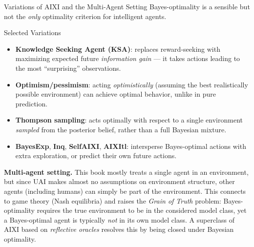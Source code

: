 \documentclass[aspectratio=169,10pt]{beamer}
\begin{document}
\begin{frame}{Variations of AIXI and the Multi-Agent Setting}
  Bayes-optimality is a sensible but not the \emph{only} optimality criterion
  for intelligent agents.

  \begin{block}{Selected Variations}
    \begin{itemize}
      \item \textbf{Knowledge Seeking Agent (KSA)}: replaces reward-seeking
        with maximizing expected future \emph{information gain} --- it takes
        actions leading to the most ``surprising'' observations.
      \item \textbf{Optimism/pessimism}: acting \emph{optimistically}
        (assuming the best realistically possible environment) can achieve
        optimal behavior, unlike in pure prediction.
      \item \textbf{Thompson sampling}: acts optimally with respect to a
        single environment \emph{sampled} from the posterior belief, rather
        than a full Bayesian mixture.
      \item \textbf{BayesExp}, \textbf{Inq}, \textbf{SelfAIXI},
        \textbf{AIXItl}: intersperse Bayes-optimal actions with extra
        exploration, or predict their own future actions.
    \end{itemize}
  \end{block}
  \textbf{Multi-agent setting.} This book mostly treats a single agent in an
  environment, but since UAI makes almost no assumptions on environment
  structure, other agents (including humans) can simply be part of the
  environment. This connects to game theory (Nash equilibria) and raises the
  \emph{Grain of Truth} problem: Bayes-optimality requires the true
  environment to be in the considered model class, yet a Bayes-optimal agent
  is typically \emph{not} in its own model class. A superclass of AIXI based
  on \emph{reflective oracles} resolves this by being closed under Bayesian
  optimality.
\end{frame}
\end{document}
